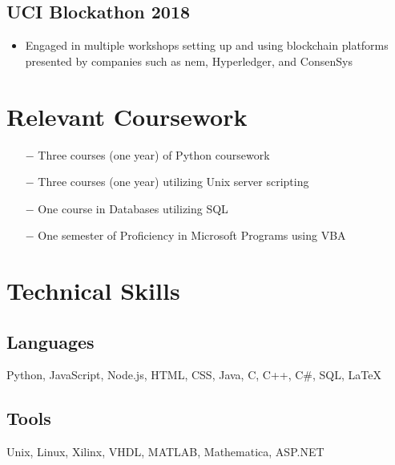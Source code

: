\documentclass[10pt]{article}
\begin{document}
\subsection{UCI Blockathon 2018}

\begin{itemize}
	\setlength\itemsep{0em}
	\item Engaged in multiple workshops setting up and using blockchain platforms presented by companies such as nem, 
Hyperledger, and ConsenSys
\end{itemize}

\section{Relevant Coursework}

\begin{itemize}
	\item[$-$] Three courses (one year) of Python coursework
	\item[$-$] Three courses (one year) utilizing Unix server scripting
	\item[$-$] One course in Databases utilizing SQL
	\item[$-$] One semester of Proficiency in Microsoft Programs using VBA
\end{itemize}

\section{Technical Skills}

\subsection{Languages}

Python, JavaScript, Node.js, HTML, CSS, Java, C, C++, C\#, SQL, \LaTeX

\subsection{Tools}

Unix, Linux, Xilinx, VHDL, MATLAB, Mathematica, ASP.NET
\end{document}
